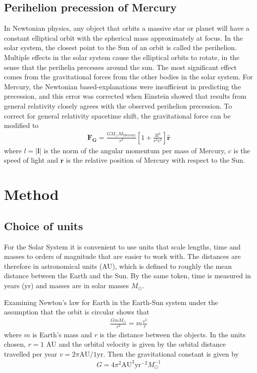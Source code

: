 \documentclass[aps,reprint]{revtex4-1}
\begin{document}
\subsection{Perihelion precession of Mercury}
In Newtonian physics, any object that orbits a massive star or planet will have a constant elliptical orbit with
the spherical mass approximately at focus. In the solar system, the closest point to the Sun of an orbit is called
the perihelion. Multiple effects in the solar system cause the elliptical orbits to rotate, in the sense that the perihelia
precesses around the sun. The most significant effect comes from the gravitational forces from the other bodies in
the solar system. For Mercury, the Newtonian based-explanations were insufficient in predicting the precession, and
this error was corrected when Einstein showed that results from general relativity closely agrees with the observed
perihelion precession. To correct for general relativity spacetime shift, the gravitational force can be modified to
\begin{align}
\label{eq:mercuryprecession}
\mathbf{F_G} = \frac{G M_\odot M_\text{Mercury}}{r^3}\left[1 + \frac{3l^2}{r^2c^2} \right] \hat{\mathbf{r}}
\end{align}
where $l = |\mathbf{l}|$ is the norm of the angular momentum per mass of Mercury, $c$ is the speed of light and
$\mathbf{r}$ is the relative position of Mercury with respect to the Sun.
\section{Method}
\label{sec:method}
\subsection{Choice of units}
For the Solar System it is convenient to use units that scale lengths, time and
masses to orders of magnitude that are easier to work with. The distances are
therefore in astronomical units (AU), which is defined to roughly the mean
distance between the Earth and the Sun. By the same token, time is measured in
years (yr) and masses are in solar masses $M_\odot$.

Examining Newton's law for Earth in the Earth-Sun system under the assumption
that the orbit is circular shows that
\begin{align*}
  \frac{GmM_\odot}{r^2} = m \frac{v^2}{r}
\end{align*}
where $m$ is Earth's mass and $r$ is the distance between the objects. In the
units chosen, $r = 1$ AU and the orbital velocity is given by the orbital distance
travelled per year $v = 2\pi \text{AU}/1 \text{yr}$. Then the gravitational
constant is given by
\begin{align}
  G = 4\pi^2 \text{AU}^3 \text{yr}^{-2} M_\odot^{-1}
\end{align}
\end{document}
